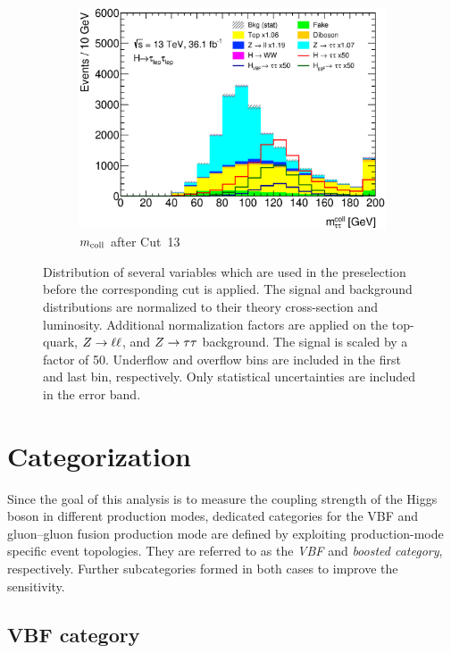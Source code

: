 \begin{figure}[htb]
\begin{subfigure}[t]{0.45\textwidth}
        \includegraphics[width=\textwidth]{./plots/event_selection/presel/ll-CutDRLL-mcoll-lin.eps}
        \caption{$m_\text{coll}$ after Cut~13}\label{fig:event_selection:cutflow:mcoll}
    \end{subfigure}
    \caption{Distribution of several variables which are used in the preselection before the corresponding cut is applied.
             The signal and background distributions are normalized to their theory cross-section and luminosity.
             Additional normalization factors are applied on the top-quark, $Z \to \ell \ell$, and $Z \to \tau \tau$ background.
             The signal is scaled by a factor of 50.
             Underflow and overflow bins are included in the first and last bin, respectively.
             Only statistical uncertainties are included in the error band.}\label{fig:event_selection:cutflow:2}
\end{figure}


\section{Categorization}\label{sec:event_selection:categorization}

Since the goal of this analysis is to measure the coupling strength of the Higgs boson
in different production modes, dedicated categories for the VBF and gluon--gluon fusion production mode
are defined by exploiting production-mode specific event topologies.
They are referred to as the \emph{VBF} and \emph{boosted category}, respectively.
Further subcategories formed in both cases to improve the sensitivity.

\subsection{VBF category}\label{sub:event_selection:vbf}

